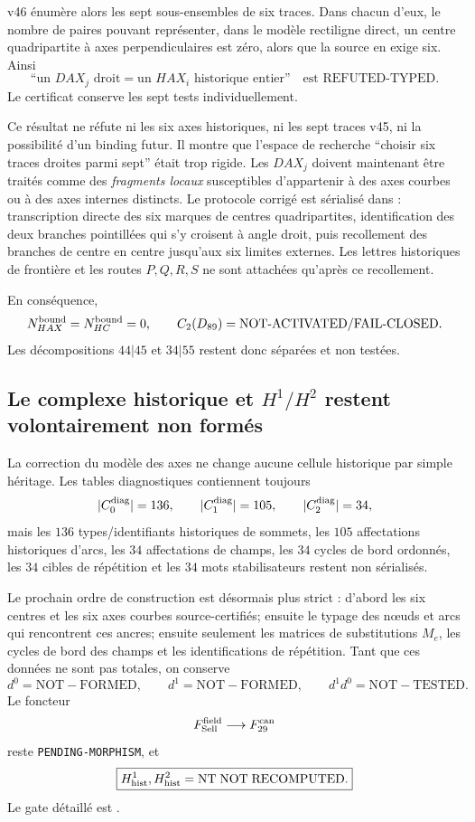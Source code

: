 \documentclass[11pt,a4paper]{article}
\newcommand{\certPending}{\texttt{PENDING-MORPHISM}}
\begin{document}
v46 énumère alors les sept sous-ensembles de six traces. Dans chacun d'eux, le nombre de paires pouvant représenter, dans le modèle rectiligne direct, un centre quadripartite à axes perpendiculaires est zéro, alors que la source en exige six. Ainsi
\[
 \boxed{
 \text{``un }DAX_j\text{ droit}=\text{un }HAX_i\text{ historique entier''}
 \quad\text{est REFUTED-TYPED}.}
\]
Le certificat  conserve les sept tests individuellement.

Ce résultat ne réfute ni les six axes historiques, ni les sept traces v45, ni la possibilité d'un binding futur. Il montre que l'espace de recherche ``choisir six traces droites parmi sept'' était trop rigide. Les $DAX_j$ doivent maintenant être traités comme des \emph{fragments locaux} susceptibles d'appartenir à des axes courbes ou à des axes internes distincts. Le protocole corrigé est sérialisé dans : transcription directe des six marques de centres quadripartites, identification des deux branches pointillées qui s'y croisent à angle droit, puis recollement des branches de centre en centre jusqu'aux six limites externes. Les lettres historiques de frontière et les routes $P,Q,R,S$ ne sont attachées qu'après ce recollement.

En conséquence,
\[
 N_{HAX}^{\rm bound}=N_{HC}^{\rm bound}=0,
 \qquad
 C_2(D_{89})=\text{NOT-ACTIVATED/FAIL-CLOSED}.
\]
Les décompositions $44|45$ et $34|55$ restent donc séparées et non testées.

\subsection{Le complexe historique et $H^1/H^2$ restent volontairement non formés}

La correction du modèle des axes ne change aucune cellule historique par simple héritage. Les tables diagnostiques contiennent toujours
\[
 |C_0^{\rm diag}|=136,
 \qquad |C_1^{\rm diag}|=105,
 \qquad |C_2^{\rm diag}|=34,
\]
mais les $136$ types/identifiants historiques de sommets, les $105$ affectations historiques d'arcs, les $34$ affectations de champs, les $34$ cycles de bord ordonnés, les $34$ cibles de répétition et les $34$ mots stabilisateurs restent non sérialisés.

Le prochain ordre de construction est désormais plus strict : d'abord les six centres et les six axes courbes source-certifiés; ensuite le typage des nœuds et arcs qui rencontrent ces ancres; ensuite seulement les matrices de substitutions $M_e$, les cycles de bord des champs et les identifications de répétition. Tant que ces données ne sont pas totales, on conserve
\[
 d^0=\mathrm{NOT\!\!\!-FORMED},
 \qquad d^1=\mathrm{NOT\!\!\!-FORMED},
 \qquad d^1d^0=\mathrm{NOT\!\!\!-TESTED}.
\]
Le foncteur
\[
 F_{\rm Sell}^{\rm field}\longrightarrow F_{29}^{\rm can}
\]
reste \certPending, et
\[
 \boxed{H^1_{\rm hist},H^2_{\rm hist}=\mathrm{NT\;NOT\;RECOMPUTED}.}
\]
Le gate détaillé est .
\end{document}
